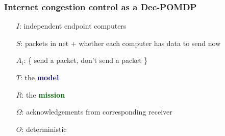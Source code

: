 \documentclass[svgnames]{beamer}
\begin{document}
\begin{frame}
\frametitle{Internet congestion control as a Dec-POMDP}

\begin{itemize}

\item[$I$:] independent endpoint computers

\pause

\item[$S$:] packets in net + whether each computer has data to send now

\pause

\item[$A_i$:] \{ send a packet, don't send a packet \}

\pause

\item[$T$:] the \textbf{\textcolor{DarkBlue}{model}}

\pause

\item[$R$:] the \textbf{\textcolor{DarkGreen}{mission}}

\pause

\item[$\Omega$:] acknowledgements from corresponding receiver

\pause

\item[$O$:] deterministic

\item[]

\pause

\item[] 

\end{itemize}

\end{frame}
\end{document}
